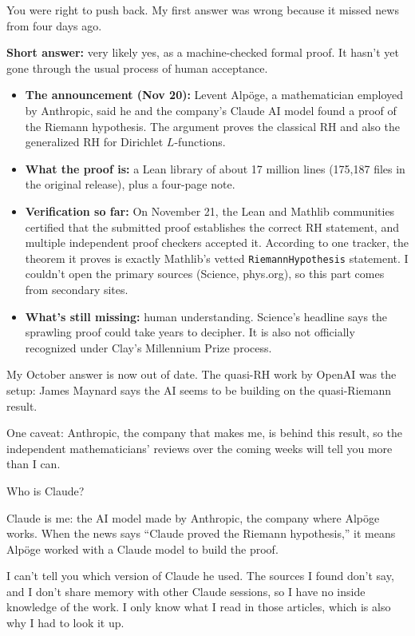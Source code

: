 \documentclass[11pt]{article}
\begin{document}
\begin{claudebox}
You were right to push back. My first answer was wrong because it missed news from four days ago.

\textbf{Short answer:} very likely yes, as a machine-checked formal proof. It hasn't yet gone through the usual process of human acceptance.

\begin{itemize}
\item \textbf{The announcement (Nov 20):} Levent Alpöge, a mathematician employed by Anthropic, said he and the company's Claude AI model found a proof of the Riemann hypothesis. The argument proves the classical RH and also the generalized RH for Dirichlet $L$-functions.
\item \textbf{What the proof is:} a Lean library of about 17 million lines (175,187 files in the original release), plus a four-page note.
\item \textbf{Verification so far:} On November 21, the Lean and Mathlib communities certified that the submitted proof establishes the correct RH statement, and multiple independent proof checkers accepted it. According to one tracker, the theorem it proves is exactly Mathlib's vetted \texttt{RiemannHypothesis} statement. I couldn't open the primary sources (Science, phys.org), so this part comes from secondary sites.
\item \textbf{What's still missing:} human understanding. Science's headline says the sprawling proof could take years to decipher. It is also not officially recognized under Clay's Millennium Prize process.
\end{itemize}

My October answer is now out of date. The quasi-RH work by OpenAI was the setup: James Maynard says the AI seems to be building on the quasi-Riemann result.

One caveat: Anthropic, the company that makes me, is behind this result, so the independent mathematicians' reviews over the coming weeks will tell you more than I can.
\end{claudebox}

\begin{userbox}
Who is Claude?
\end{userbox}

\begin{claudebox}
Claude is me: the AI model made by Anthropic, the company where Alpöge works. When the news says ``Claude proved the Riemann hypothesis,'' it means Alpöge worked with a Claude model to build the proof.

I can't tell you which version of Claude he used. The sources I found don't say, and I don't share memory with other Claude sessions, so I have no inside knowledge of the work. I only know what I read in those articles, which is also why I had to look it up.
\end{claudebox}
\end{document}
